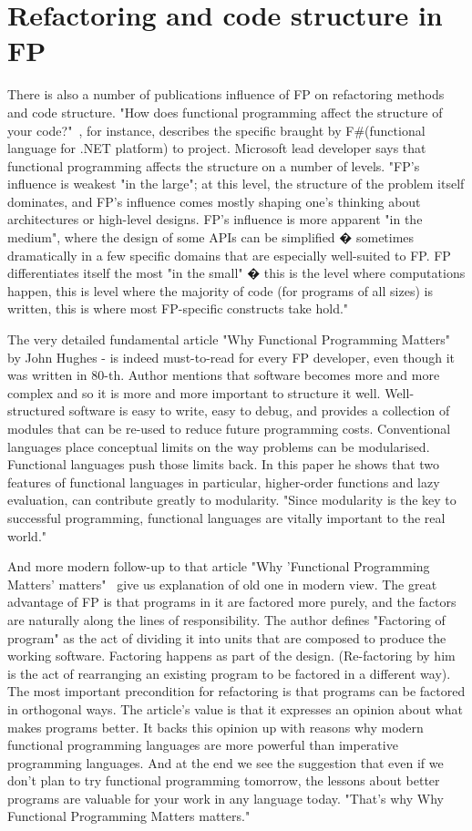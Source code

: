 \section{Refactoring and code structure in FP}
There is also a number of publications influence of FP on refactoring methods and code structure.
"How does functional programming affect the structure of your code?"~\cite{res4}, for instance, describes the specific braught by F\#(functional language for .NET platform) to project. Microsoft lead developer says that functional programming affects the structure on a number of levels.  "FP's influence is weakest "in the large"; at this level, the structure of the problem itself dominates, and FP's influence comes mostly shaping one's thinking about architectures or high-level designs. FP's influence is more apparent "in the medium", where the design of some APIs can be simplified � sometimes dramatically in a few specific domains that are especially well-suited to FP. FP differentiates itself the most "in the small" � this is the level where computations happen, this is level where the majority of code (for programs of all sizes) is written, this is where most FP-specific constructs take hold."

The very  detailed fundamental article "Why Functional Programming Matters"~\cite{res19} by John Hughes - is indeed must-to-read for every FP developer, even though it was written in 80-th. Author mentions that software becomes more and more complex and so it is more and more important to structure it well. Well-structured software is easy to write, easy to debug, and provides a collection of modules that can be re-used to reduce future programming costs. Conventional languages place conceptual limits on the way problems can be modularised. Functional languages push those limits back. In this paper he shows that two features of functional languages in particular, higher-order functions and lazy evaluation, can contribute greatly to modularity.
"Since modularity is the key to successful programming, functional languages are vitally important to the real world."

And more modern follow-up to that article "Why 'Functional Programming Matters' matters"~\cite{res20} give us explanation of old one in modern view.
The great advantage of FP is that programs in it are factored more purely, and the factors are naturally along the lines of responsibility. The author defines "Factoring of program" as the act of dividing it into units that are composed to produce the working software. Factoring happens as part of the design. (Re-factoring by him is the act of rearranging an existing program to be factored in a different way). The most important precondition for refactoring is that programs can be factored in orthogonal ways. The article's value is that it expresses an opinion about what makes programs better. It backs this opinion up with reasons why modern functional programming languages are more powerful than imperative programming languages. 
And at the end we see the suggestion that even if we don't plan to try functional programming tomorrow, the lessons about better programs are valuable for your work in any language today.
"That's why Why Functional Programming Matters matters."